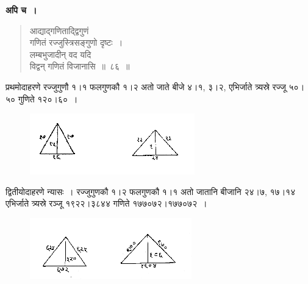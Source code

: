 \documentclass[11pt, openany]{book}
\begin{document}
 \textbf{अपि च~।} 
\begin{quote}
    \bqt 
    आद्याद्गणिताद्द्विगुणं \\
गणितं रज्जुस्त्रिसङ्गुणो दृष्टः~। \\
लम्बभुजादीन् वद यदि \\
विद्वन् गणितं विजानासि~॥~८६~॥~
\end{quote}

 प्रथमोदाहरणे रज्जुगुणौ १।१ फलगुणकौ १।२ अतो जाते बीजे ४।१, ३।२, एभिर्जाते त्र्यस्रे रज्जू ५०।५० गुणिते १२०।६०~।
\vspace{-2mm}

\begin{figure}[h!]
     \centering
     \includegraphics[scale=0.85]{graphics/capture136.png}
\end{figure} 
\vspace{-4mm}

 द्वितीयोदाहरणे न्यासः~। रज्जुगुणकौ १।२ फलगुणकौ १।१ अतो जातानि बीजानि २४।७, १७।१४ एभिर्जाते त्र्यस्रे रञ्जू १९२२।३८४४ गणिते १७७०७२।१७७०७२~।
\newpage
\setcounter{footnote}{0}

\begin{figure}[h!]
     \centering
     \includegraphics[scale=0.85]{graphics/capture137.png}
\end{figure} 
\vspace{-3mm}
\end{document}
